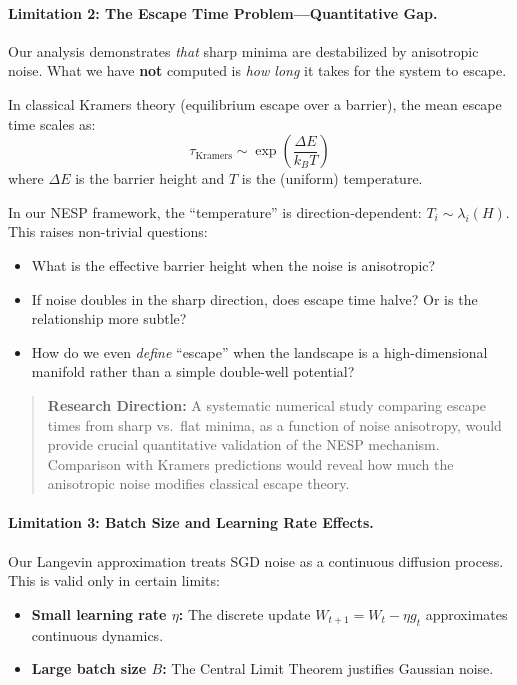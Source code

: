 \documentclass[
  journal=largetwo,
  year=2025,
  volume=37,
]{cup-journal}
\begin{document}
\paragraph{Limitation 2: The Escape Time Problem---Quantitative Gap.}

Our analysis demonstrates \textit{that} sharp minima are destabilized by anisotropic noise. What we have \textbf{not} computed is \textit{how long} it takes for the system to escape.

In classical Kramers theory (equilibrium escape over a barrier), the mean escape time scales as:
\begin{equation}
    \tau_{\text{Kramers}} \sim \exp\left( \frac{\Delta E}{k_B T} \right)
\end{equation}
where $\Delta E$ is the barrier height and $T$ is the (uniform) temperature.

In our NESP framework, the ``temperature'' is direction-dependent: $T_i \sim \lambda_i(H)$. This raises non-trivial questions:
\begin{itemize}
    \item What is the effective barrier height when the noise is anisotropic?
    \item If noise doubles in the sharp direction, does escape time halve? Or is the relationship more subtle?
    \item How do we even \textit{define} ``escape'' when the landscape is a high-dimensional manifold rather than a simple double-well potential?
\end{itemize}

\begin{quote}
\textbf{Research Direction:} A systematic numerical study comparing escape times from sharp vs.\ flat minima, as a function of noise anisotropy, would provide crucial quantitative validation of the NESP mechanism. Comparison with Kramers predictions would reveal how much the anisotropic noise modifies classical escape theory.
\end{quote}

\paragraph{Limitation 3: Batch Size and Learning Rate Effects.}

Our Langevin approximation treats SGD noise as a continuous diffusion process. This is valid only in certain limits:
\begin{itemize}
    \item \textbf{Small learning rate $\eta$:} The discrete update $W_{t+1} = W_t - \eta g_t$ approximates continuous dynamics.
    \item \textbf{Large batch size $B$:} The Central Limit Theorem justifies Gaussian noise.
\end{itemize}
\end{document}
